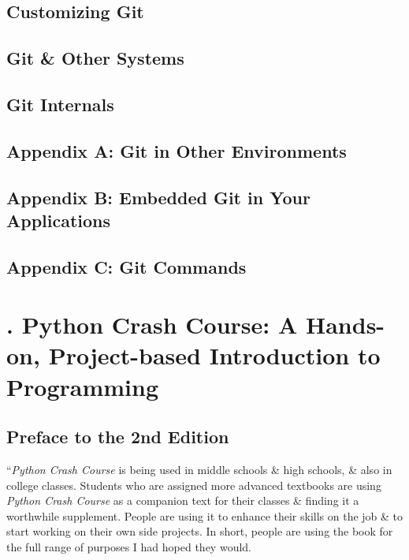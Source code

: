 \documentclass[oneside]{book}
\numberwithin{equation}{section}
\begin{document}
\section{Customizing Git}


\section{Git \& Other Systems}


\section{Git Internals}


\section{Appendix A: Git in Other Environments}


\section{Appendix B: Embedded Git in Your Applications}


\section{Appendix C: Git Commands}


\chapter{\cite{Matthes2019}. Python Crash Course: A Hands-on, Project-based Introduction to Programming}

\section*{Preface to the 2nd Edition}
``\textit{Python Crash Course} is being used in middle schools \& high schools, \& also in college classes. Students who are assigned more advanced textbooks are using \textit{Python Crash Course} as a companion text for their classes \& finding it a worthwhile supplement. People are using it to enhance their skills on the job \& to start working on their own side projects. In short, people are using the book for the full range of purposes I had hoped they would.
\end{document}
